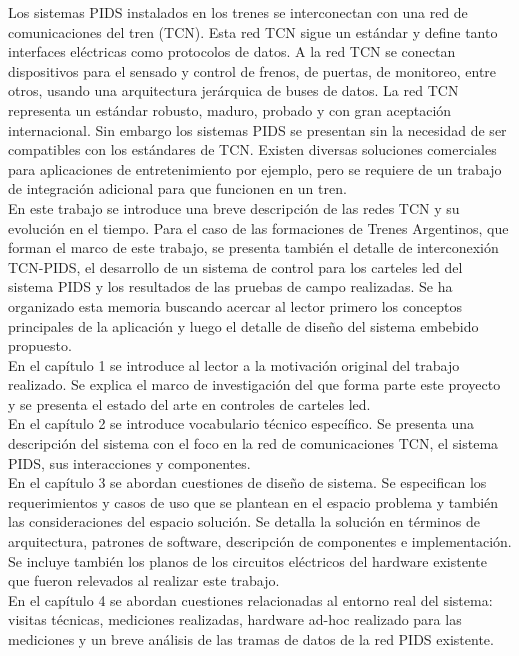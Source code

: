  Los sistemas PIDS instalados en los trenes se interconectan con una red de comunicaciones del tren (TCN). Esta red TCN sigue un estándar y define tanto interfaces eléctricas como protocolos de datos. A la red TCN se conectan dispositivos para el sensado y control de frenos, de puertas, de monitoreo, entre otros, usando una arquitectura jerárquica de buses de datos. La red TCN representa un estándar robusto, maduro, probado y con gran aceptación internacional. Sin embargo los sistemas PIDS se presentan sin la necesidad de ser compatibles con los estándares de TCN. Existen diversas soluciones comerciales para aplicaciones de entretenimiento por ejemplo, pero se requiere de un trabajo de integración adicional para que funcionen en un tren.\\
 
 En este trabajo se introduce una breve descripción de las redes TCN y su evolución en el tiempo. Para el caso de las formaciones de Trenes Argentinos, que forman el marco de este trabajo, se presenta también el detalle de interconexión TCN-PIDS, el desarrollo de un sistema de control para los carteles led del sistema PIDS y los resultados de las pruebas de campo realizadas. Se ha organizado esta memoria buscando acercar al lector primero los conceptos principales de la aplicación y luego el detalle de diseño del sistema embebido propuesto. \\
  

En el capítulo 1 se introduce al lector a la motivación original del trabajo realizado. Se explica el marco de investigación del que forma parte este proyecto y se presenta el estado del arte en controles de carteles led.\\

En el capítulo 2 se introduce vocabulario técnico específico. Se presenta una descripción del sistema con el foco en la red de comunicaciones TCN, el sistema PIDS, sus interacciones y componentes.\\

En el capítulo 3 se abordan cuestiones de diseño de sistema. Se especifican los requerimientos y casos de uso que se plantean en el espacio problema y también las consideraciones del espacio solución. Se detalla la solución en términos de arquitectura, patrones de software, descripción de componentes e implementación. Se incluye también los planos de los circuitos eléctricos del hardware existente que fueron relevados al realizar este trabajo.\\

En el capítulo 4 se abordan cuestiones relacionadas al entorno real del sistema: visitas técnicas, mediciones realizadas, hardware ad-hoc realizado para las mediciones y un breve análisis de las tramas de datos de la red PIDS existente.\\

